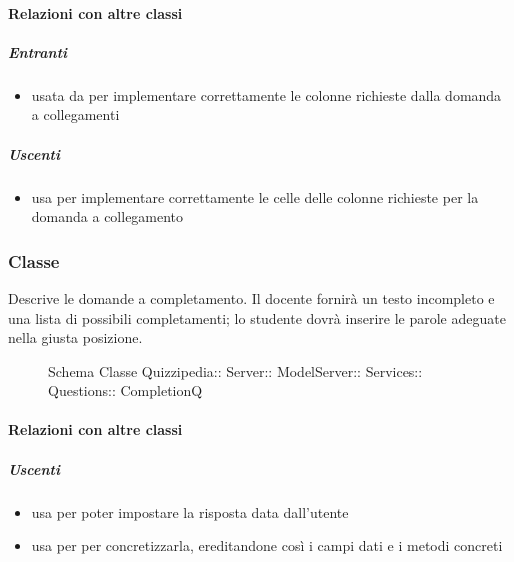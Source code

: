 \paragraph{Relazioni con altre classi}
\subparagraph{Entranti}
\begin{itemize}
\item usata da  per implementare correttamente le colonne richieste dalla domanda a collegamenti
\end{itemize}
\subparagraph{Uscenti}
\begin{itemize}
\item usa  per implementare correttamente le celle delle colonne richieste per la domanda a collegamento
\end{itemize}
\subsubsection{Classe }
Descrive le domande a completamento. Il docente fornirà un testo incompleto e una lista di possibili completamenti; lo studente dovrà inserire le parole adeguate nella giusta posizione.
\begin{figure}[H]
\centering
\noindent{}
\caption[Schema Classe CompletionQ]{Schema Classe Quizzipedia:: Server:: ModelServer:: Services:: Questions:: CompletionQ}
\end{figure}
\paragraph{Relazioni con altre classi}
\subparagraph{Uscenti}
\begin{itemize}
\item usa  per poter impostare la risposta data dall'utente
\item usa  per per concretizzarla, ereditandone così i campi dati e i metodi concreti
\end{itemize}
